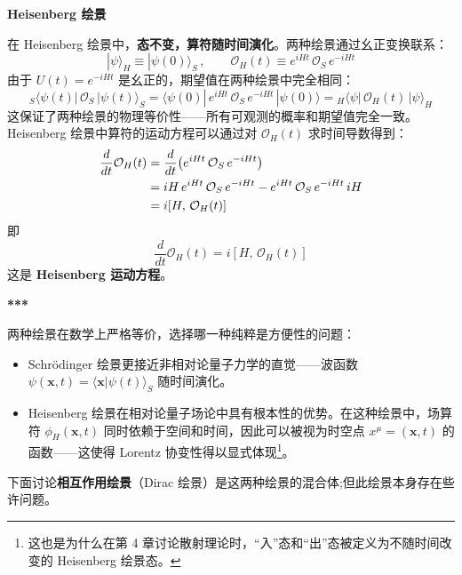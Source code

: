 \begin{center}\vspace{2ex}
\textbf{Heisenberg 绘景}
\vspace{2ex}\end{center}
在 Heisenberg 绘景中，\textbf{态不变，算符随时间演化}。两种绘景通过幺正变换联系：
\begin{equation}
|\psi\rangle_H \equiv |\psi(0)\rangle_S\,,\qquad
\mathcal{O}_H(t) \equiv e^{iHt}\,\mathcal{O}_S\,e^{-iHt}
\end{equation}
由于 $U(t)=e^{-iHt}$ 是幺正的，期望值在两种绘景中完全相同：
\begin{equation}
{}_S\langle\psi(t)|\,\mathcal{O}_S\,|\psi(t)\rangle_S
= \langle\psi(0)|\,e^{iHt}\,\mathcal{O}_S\,e^{-iHt}\,|\psi(0)\rangle
= {}_H\langle\psi|\,\mathcal{O}_H(t)\,|\psi\rangle_H
\end{equation}
这保证了两种绘景的物理等价性——\color{blue}所有可观测的概率和期望值完全一致。\normalcolor Heisenberg 绘景中算符的运动方程可以通过对 $\mathcal{O}_H(t)$ 求时间导数得到：
\begin{align}
\frac{d}{dt}\mathcal{O}_H(t)
&= \frac{d}{dt}\bigl(e^{iHt}\,\mathcal{O}_S\,e^{-iHt}\bigr) \notag\\
&= iH\,e^{iHt}\,\mathcal{O}_S\,e^{-iHt}
- e^{iHt}\,\mathcal{O}_S\,e^{-iHt}\,iH \notag\\
&= i[H,\,\mathcal{O}_H(t)]
\end{align}
即
\begin{equation}
\frac{d}{dt}\mathcal{O}_H(t) = i[H,\,\mathcal{O}_H(t)]
\end{equation}
这是 \textbf{Heisenberg 运动方程}。

\begin{center}\vspace{2ex}
\textbf{***}
\vspace{2ex}\end{center}

两种绘景在数学上严格等价，选择哪一种纯粹是方便性的问题：

\begin{itemize}
\item Schr\"{o}dinger 绘景更接近非相对论量子力学的直觉——波函数 $\psi(\pmb{x},t)=\langle\pmb{x}|\psi(t)\rangle_S$ 随时间演化。

\item Heisenberg 绘景在相对论量子场论中具有根本性的优势。在这种绘景中，场算符 $\phi_H(\pmb{x},t)$ 同时依赖于空间和时间，因此可以被视为时空点 $x^\mu=(\pmb{x},t)$ 的函数——这使得 Lorentz 协变性得以显式体现\footnote{这也是为什么在第 4 章讨论散射理论时，``入''态和``出''态被定义为不随时间改变的 Heisenberg 绘景态。}。
\end{itemize}
下面讨论\textbf{相互作用绘景}（Dirac 绘景）是这两种绘景的混合体;但此绘景本身存在些许问题。
